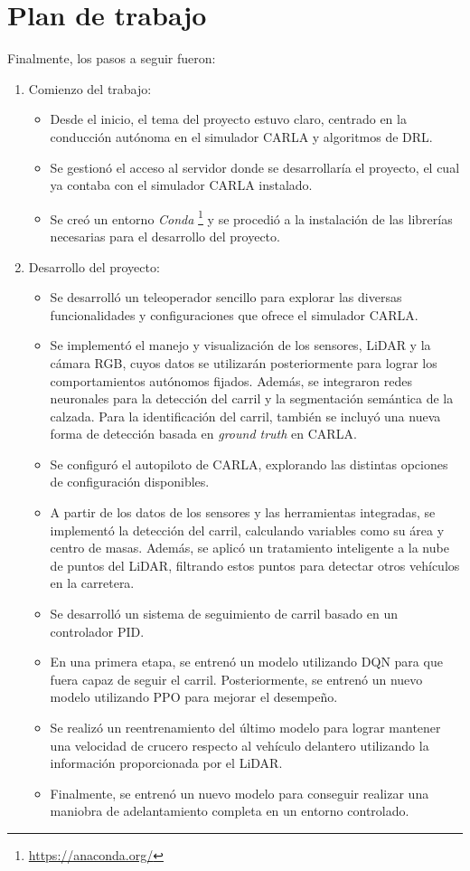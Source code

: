 \section{Plan de trabajo}
\label{sec:plantrabajo}

Finalmente, los pasos a seguir fueron:

\begin{enumerate}
\item Comienzo del trabajo:
\begin{itemize}
\item Desde el inicio, el tema del proyecto estuvo claro, centrado en la conducción autónoma en el simulador CARLA y algoritmos de \ac{DRL}.
\item Se gestionó el acceso al servidor donde se desarrollaría el proyecto, el cual ya contaba con el simulador CARLA instalado. 
\item Se creó un entorno \textit{Conda} \footnote{\url{https://anaconda.org/}} y se procedió a la instalación de las librerías necesarias para el desarrollo del proyecto.
\end{itemize}

\item Desarrollo del proyecto:
\begin{itemize}
\item Se desarrolló un teleoperador sencillo para explorar las diversas funcionalidades y configuraciones que ofrece el simulador CARLA.
\item Se implementó el manejo y visualización de los sensores, \ac{LiDAR} y la cámara RGB, cuyos datos se utilizarán posteriormente para lograr los comportamientos autónomos fijados. Además, se integraron redes neuronales para la detección del carril y la segmentación semántica de la calzada. Para la identificación del carril, también se incluyó una nueva forma de detección basada en \textit{ground truth} en CARLA. 
\item Se configuró el autopiloto de CARLA, explorando las distintas opciones de configuración disponibles.
\item A partir de los datos de los sensores y las herramientas integradas, se implementó la detección del carril, calculando variables como su área y centro de masas. Además, se aplicó un tratamiento inteligente a la nube de puntos del \ac{LiDAR}, filtrando estos puntos para detectar otros vehículos en la carretera.
\item Se desarrolló un sistema de seguimiento de carril basado en un controlador \ac{PID}.
\item En una primera etapa, se entrenó un modelo utilizando \ac{DQN} para que fuera capaz de seguir el carril. Posteriormente, se entrenó un nuevo modelo utilizando \ac{PPO} para mejorar el desempeño.
\item Se realizó un reentrenamiento del último modelo para lograr mantener una velocidad de crucero respecto al vehículo delantero utilizando la información proporcionada por el \ac{LiDAR}.
\item Finalmente, se entrenó un nuevo modelo para conseguir realizar una maniobra de adelantamiento completa en un entorno controlado.
\end{itemize}


\end{enumerate}
